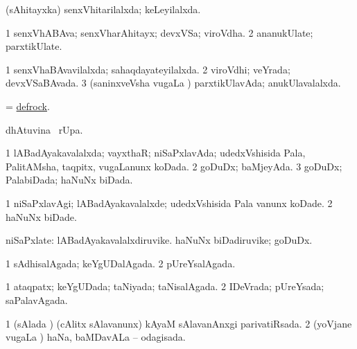 \bentry
{} 
\gl{\gu}
\expl{}
\bmng
 (sAhitayxka) senxVhitarilalxda; keLeyilalxda. 
\emng
\eentry

\bentry
{} 
\gl{\nA}
\expl{}
\bmng
\bnum
\num{1} senxVhABAva; senxVharAhitayx; devxVSa; viroVdha. 
\num{2} ananukUlate; parxtikUlate. 
\enum
\emng
\eentry

\bentry
{} 
\gl{\gu}
\bmng
\bnum
\num{1} senxVhaBAvavilalxda; sahaqdayateyilalxda. 
\num{2} viroVdhi; veYrada; devxVSaBAvada. 
\num{3} (saninxveVsha \mo vugaLa \vi) parxtikUlavAda; anukUlavalalxda. 
\enum
\emng
\eentry

\bentry
{} 
\gl{\sakirx}
\expl{}
\bmng
 = \hyperref{kandict_d.pdf}{D}{defrock}{defrock}. 
\emng
\eentry

\bentry
{} 
\gl{\kirx}
\expl{}
\bmng
  dhAtuvina \BUkaq\ rUpa. 
\emng
\eentry

\bentry
{} 
\gl{\kirx}
\expl{}
\bmng
\emng
\eentry

\bentry
{} 
\gl{\gu}
\expl{}
\bmng
\bnum
\num{1} lABadAyakavalalxda; vayxthaR; niSaPxlavAda; udedxVshisida Pala, PalitAMsha, taqpitx, \mo vugaLanunx koDada. 
\num{2} goDuDx; baMjeyAda. 
\num{3} goDuDx; PalabiDada; haNuNx biDada. 
\enum
\emng
\eentry

\bentry
{} 
\gl{\kirxvi}
\expl{}
\bmng
\bnum
\num{1} niSaPxlavAgi; lABadAyakavalalxde; udedxVshisida Pala \mo vanunx koDade. 
\num{2} haNuNx biDade. 
\enum
\emng
\eentry

\bentry
{} 
\gl{\nA}
\expl{}
\bmng
 niSaPxlate: 
\banum
{} lABadAyakavalalxdiruvike. 
 haNuNx biDadiruvike; goDuDx. 
\eanum
\emng
\eentry

\bentry
{} 
\gl{\gu} 
\bmng
\bnum
\num{1} sAdhisalAgada; keYgUDalAgada. 
\num{2} pUreYsalAgada. 
\enum
\emng
\eentry

\bentry
{} 
\gl{\gu}
\bmng
\bnum
\num{1} ataqpatx; keYgUDada; taNiyada; taNisalAgada. 
\num{2} IDeVrada; pUreYsada; saPalavAgada. 
\enum
\emng
\eentry

\bentry
{} 
\gl{\gu}
\expl{}
\bmng
\bnum
\num{1} (sAlada \vi) (cAlitx sAlavanunx) kAyaM sAlavanAnxgi parivatiRsada. 
\num{2} (yoVjane \mo vugaLa \vi) haNa, baMDavALa -- odagisada. 
\enum
\emng
\eentry

